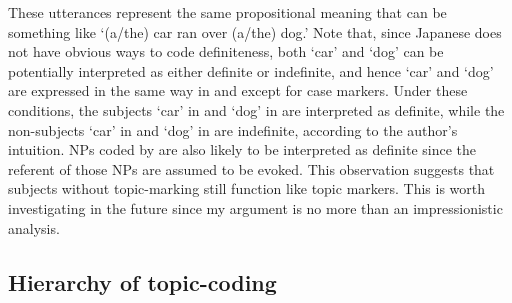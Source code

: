 These utterances represent the same propositional meaning
that can be something like `(a/the) car ran over (a/the) dog.'
Note that,
since Japanese does not have obvious ways to code definiteness,
both `car' and `dog' can be potentially interpreted as either definite or indefinite,
and hence `car' and `dog' are expressed in the same way in \LLast and \Last
except for case markers.
Under these conditions,
the subjects `car' in \LLast and `dog' in \Last are interpreted as definite, %
while the non-subjects `car' in \Last and `dog' in \LLast are indefinite,
according to the author's intuition.
NPs coded by  are also likely to be interpreted as definite since
the referent of those NPs are assumed to be evoked.
This observation suggests that subjects without topic-marking still function like topic markers.
This is worth investigating in the future
since my argument is no more than an impressionistic analysis.


%


\subsection{Hierarchy of topic-coding}\label{Par:ArgStr:TopHierarchy}


